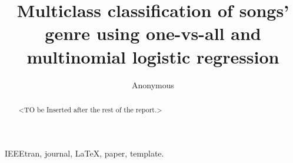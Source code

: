 \documentclass[journal]{IEEEtran}
\begin{document}
%
\title{Multiclass classification of songs' genre using one-vs-all and multinomial logistic regression}

\author{Anonymous}

\maketitle


\begin{abstract}
<TO be Inserted after the rest of the report.>
\blindtext[1]
\end{abstract}

\begin{IEEEkeywords}
IEEEtran, journal, \LaTeX, paper, template.
\end{IEEEkeywords}






%
\IEEEpeerreviewmaketitle
\end{document}
